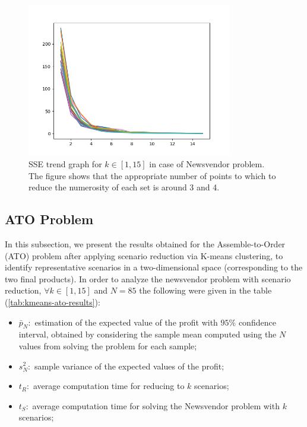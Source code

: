 \documentclass[a4paper,12pt]{article}
\begin{document}
	\begin{figure}[H]
		\centering
		\includegraphics[width=0.8\textwidth]{../immagini/sseNV.png}
		\caption{SSE trend graph for $k \in [1,15]$ in case of Newsvendor problem. The figure shows that the appropriate number of points to which to reduce the numerosity of each set is around 3 and 4.}
		\label{fig:sse-nv}
	\end{figure}
	
	
	\subsection{ATO Problem}
	In this subsection, we present the results obtained for the Assemble-to-Order (ATO) problem after applying scenario reduction via K-means clustering, to identify representative scenarios in a two-dimensional space (corresponding to the two final products). In order to analyze the newsvendor problem with scenario reduction, $\forall k \in [1,15]$ and $N = 85$ the following were given in the table (\ref{tab:kmeans-ato-results}):
	\begin{itemize}
		\item $\bar{p}_{N}:$ estimation of the expected value of the profit with $95\%$ confidence interval, obtained by considering the sample mean computed using the $N$ values from solving the problem for each sample; 
		\item $s^{2}_{N}:$ sample variance of the expected values of the profit;
		\item $t_{R}:$ average computation time for reducing to $k$ scenarios;
		\item $t_{S}:$ average computation time for solving the Newsvendor problem with $k$ scenarios;
	\end{itemize}~
	
\end{document}
